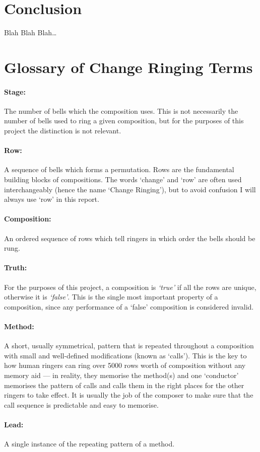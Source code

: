 \documentclass[12pt]{article}
\begin{document}
\pagebreak

\section{Conclusion}

Blah Blah Blah\ldots



\pagebreak

\section{Glossary of Change Ringing Terms}

\paragraph{Stage:} The number of bells which the composition uses.  This is not necessarily the
number of bells used to ring a given composition, but for the purposes of this project the
distinction is not relevant.

\paragraph{Row:} A sequence of bells which forms a permutation.  Rows are the fundamental building
blocks of compositions.  The words `change' and `row' are often used interchangeably (hence the name
`Change Ringing'), but to avoid confusion I will always use `row' in this report.

\paragraph{Composition:} An ordered sequence of rows which tell ringers in which order the bells
should be rung.

\paragraph{Truth:} For the purposes of this project, a composition is \emph{`true'} if all the rows
are unique, otherwise it is \emph{`false'}.  This is the single most important property of a
composition, since any performance of a `false' composition is considered invalid.

\paragraph{Method:} A short, usually symmetrical, pattern that is repeated throughout a composition
with small and well-defined modifications (known as `calls').  This is the key to how human ringers
can ring over 5000 rows worth of composition without any memory aid --- in reality, they memorise
the method(s) and one `conductor' memorises the pattern of calls and calls them in the right places
for the other ringers to take effect.  It is usually the job of the composer to make sure that the
call sequence is predictable and easy to memorise.

\paragraph{Lead:} A single instance of the repeating pattern of a method.
\end{document}
